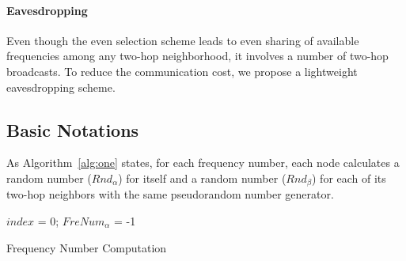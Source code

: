 \documentclass[prodmode,acmtecs]{acmsmall}
\begin{document}
\paragraph{Eavesdropping}

Even though the even selection scheme leads to even sharing of
available frequencies among any two-hop neighborhood, it involves a
number of two-hop broadcasts. To reduce the communication cost, we
propose a lightweight eavesdropping scheme.

\subsection{Basic Notations}

As Algorithm~\ref{alg:one} states, for each frequency
number, each node calculates a random number (${\textit{Rnd}}_{\alpha}$) for
itself and a random number (${\textit{Rnd}}_{\beta}$) for each of its two-hop
neighbors with the same pseudorandom number generator.
\begin{algorithm}[t]
\SetAlgoNoLine
{}
$index$ = 0; $FreNum_{\alpha}$ = -1\;
\caption{Frequency Number Computation}
\label{alg:one}
\end{algorithm}
\end{document}
